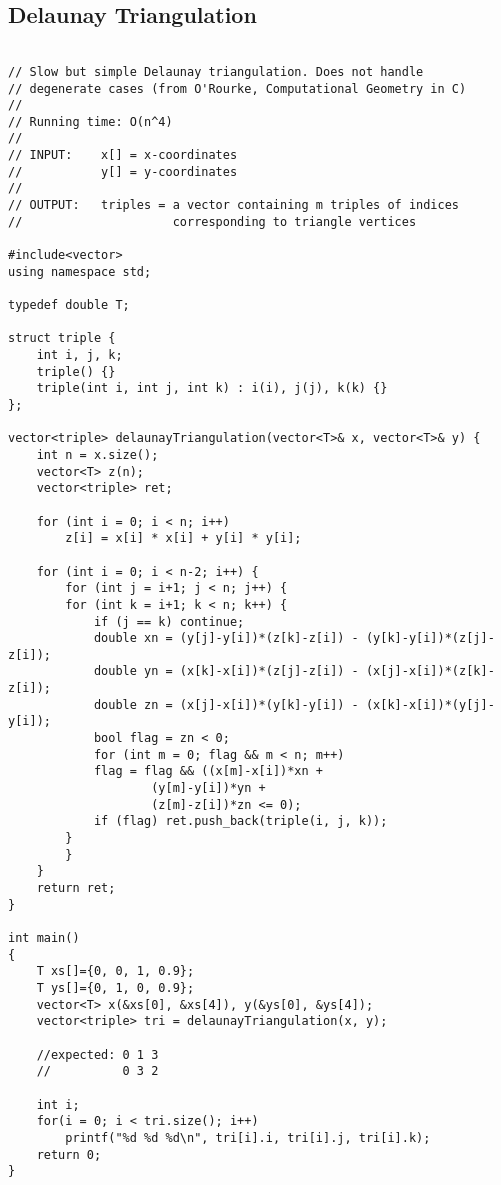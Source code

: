 \subsection{Delaunay Triangulation}
\begin{lstlisting}

// Slow but simple Delaunay triangulation. Does not handle
// degenerate cases (from O'Rourke, Computational Geometry in C)
//
// Running time: O(n^4)
//
// INPUT:    x[] = x-coordinates
//           y[] = y-coordinates
//
// OUTPUT:   triples = a vector containing m triples of indices
//                     corresponding to triangle vertices

#include<vector>
using namespace std;

typedef double T;

struct triple {
    int i, j, k;
    triple() {}
    triple(int i, int j, int k) : i(i), j(j), k(k) {}
};

vector<triple> delaunayTriangulation(vector<T>& x, vector<T>& y) {
	int n = x.size();
	vector<T> z(n);
	vector<triple> ret;

	for (int i = 0; i < n; i++)
	    z[i] = x[i] * x[i] + y[i] * y[i];

	for (int i = 0; i < n-2; i++) {
	    for (int j = i+1; j < n; j++) {
		for (int k = i+1; k < n; k++) {
		    if (j == k) continue;
		    double xn = (y[j]-y[i])*(z[k]-z[i]) - (y[k]-y[i])*(z[j]-z[i]);
		    double yn = (x[k]-x[i])*(z[j]-z[i]) - (x[j]-x[i])*(z[k]-z[i]);
		    double zn = (x[j]-x[i])*(y[k]-y[i]) - (x[k]-x[i])*(y[j]-y[i]);
		    bool flag = zn < 0;
		    for (int m = 0; flag && m < n; m++)
			flag = flag && ((x[m]-x[i])*xn + 
					(y[m]-y[i])*yn + 
					(z[m]-z[i])*zn <= 0);
		    if (flag) ret.push_back(triple(i, j, k));
		}
	    }
	}
	return ret;
}

int main()
{
    T xs[]={0, 0, 1, 0.9};
    T ys[]={0, 1, 0, 0.9};
    vector<T> x(&xs[0], &xs[4]), y(&ys[0], &ys[4]);
    vector<triple> tri = delaunayTriangulation(x, y);
    
    //expected: 0 1 3
    //          0 3 2
    
    int i;
    for(i = 0; i < tri.size(); i++)
        printf("%d %d %d\n", tri[i].i, tri[i].j, tri[i].k);
    return 0;
}

\end{lstlisting}